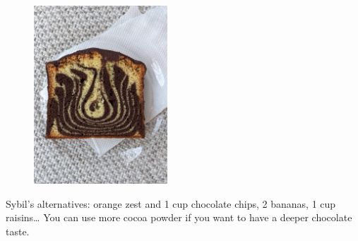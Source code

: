 \begin{figure}
  \includegraphics[width=50mm]{dermardiros/images/Grandma cake 2.jpg}
\end{figure}

Sybil’s alternatives: orange zest and 1 cup chocolate chips, 2 bananas, 1 cup raisins… You can use more cocoa powder if you want to have a deeper chocolate taste.

